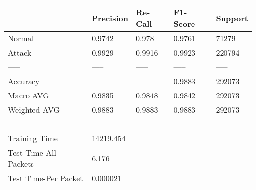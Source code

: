 \begin{tabular}{lllll}
\toprule
{} &  Precision & Re-Call & F1-Score & Support \\
\midrule
Normal                &     0.9742 &   0.978 &   0.9761 &   71279 \\
Attack                &     0.9929 &  0.9916 &   0.9923 &  220794 \\
-----                 &      ----- &   ----- &    ----- &   ----- \\
Accuracy              &            &         &   0.9883 &  292073 \\
Macro AVG             &     0.9835 &  0.9848 &   0.9842 &  292073 \\
Weighted AVG          &     0.9883 &  0.9883 &   0.9883 &  292073 \\
-----                 &      ----- &   ----- &    ----- &   ----- \\
Training Time         &  14219.454 &   ----- &    ----- &   ----- \\
Test Time-All Packets &      6.176 &   ----- &    ----- &   ----- \\
Test Time-Per Packet  &   0.000021 &   ----- &    ----- &   ----- \\
\bottomrule
\end{tabular}
